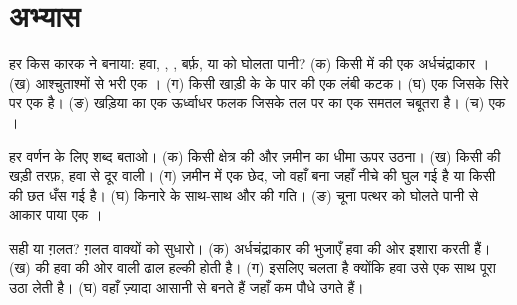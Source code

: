\section{अभ्यास}

\begin{exercise}[$\star$]\label{exo:g9:landforms:1}
हर  किस कारक ने बनाया: हवा, , , बर्फ़, या  को घोलता पानी?
(क) किसी  में  की एक अर्धचंद्राकार । (ख) आश्चुताश्मों से भरी एक ।
(ग) किसी खाड़ी के  के पार  की एक लंबी कटक। (घ) एक  जिसके
सिरे पर एक  है। (ङ) खड़िया का एक ऊर्ध्वाधर फलक जिसके तल पर  का एक समतल चबूतरा
है। (च) एक ।
\end{exercise}

\begin{exercise}[$\star$]\label{exo:g9:landforms:2}
हर वर्णन के लिए शब्द बताओ। (क) किसी क्षेत्र की  और ज़मीन का धीमा ऊपर उठना।
(ख) किसी  की खड़ी तरफ़, हवा से दूर वाली। (ग) ज़मीन में एक छेद, जो वहाँ बना जहाँ नीचे की
 घुल गई है या किसी  की छत धँस गई है। (घ) किनारे के साथ-साथ  और  की गति।
(ङ) चूना पत्थर को घोलते पानी से आकार पाया एक ।
\end{exercise}

\begin{exercise}[$\star$]\label{exo:g9:landforms:3}
सही या ग़लत? ग़लत वाक्यों को सुधारो। (क) अर्धचंद्राकार  की भुजाएँ हवा की ओर इशारा करती
हैं। (ख)  की हवा की ओर वाली ढाल हल्की होती है। (ग)  इसलिए चलता है क्योंकि हवा
उसे एक साथ पूरा उठा लेती है। (घ)  वहाँ ज़्यादा आसानी से बनते हैं जहाँ कम पौधे
उगते हैं।
\end{exercise}

